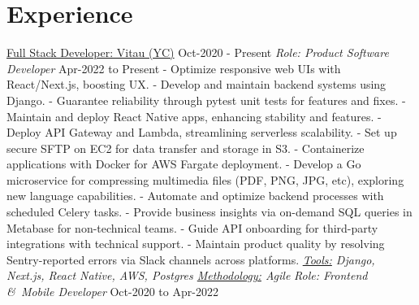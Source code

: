 \documentclass[letterpaper]{twentysecondcv} %
\begin{document}
\section{Experience}
\newline\newline 
{\large\underline{Full Stack Developer: Vitau (YC)}}  \hspace*{105pt}  Oct-2020 - Present
\newline\newline
{\textit{Role: Product Software Developer}} \hspace*{131pt} Apr-2022 to Present
    \newline- Optimize responsive web UIs with React/Next.js, boosting UX.
    \newline- Develop and maintain backend systems using Django.
    \newline- Guarantee reliability through pytest unit tests for features and fixes.
    \newline- Maintain and deploy React Native apps, enhancing stability and features.
    \newline- Deploy API Gateway and Lambda, streamlining serverless scalability.
    \newline- Set up secure SFTP on EC2 for data transfer and storage in S3.
    \newline- Containerize applications with Docker for AWS Fargate deployment.
    \newline- Develop a Go microservice for compressing multimedia files (PDF, PNG, JPG, etc), exploring new language capabilities.
    \newline- Automate and optimize backend processes with scheduled Celery tasks.
    \newline- Provide business insights via on-demand SQL queries in Metabase for non-technical teams.
    \newline- Guide API onboarding for third-party integrations with technical support.
    \newline- Maintain product quality by resolving Sentry-reported errors via Slack channels across platforms.
    \newline\newline\textit{\underline{Tools:} Django, Next.js, React Native, AWS, Postgres \underline{Methodology:} Agile}
    \newline\newline
{\textit{Role: Frontend \&\ Mobile Developer}} \hspace*{97pt} Oct-2020 to Apr-2022
\end{document}
